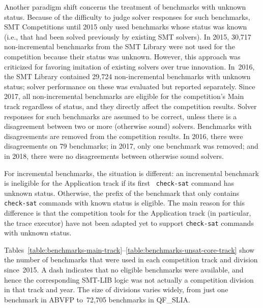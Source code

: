\documentclass[dvipsnames,table,twoside,11pt]{article}
\begin{document}
Another paradigm shift concerns the treatment of benchmarks with
unknown status.  Because of the difficulty to judge solver responses
for such benchmarks, SMT Competitions until 2015 only used benchmarks
whose status was known (i.e., that had been solved previously by
existing SMT solvers).  In 2015, 30,717 non-incremental benchmarks
from the SMT Library were not used for the competition because their
status was unknown.  However, this approach was criticized for
favoring imitation of existing solvers over true innovation.  In~2016,
the SMT Library contained 29,724 non-incremental benchmarks with
unknown status; solver performance on these was evaluated but reported
separately.  Since 2017, all non-incremental benchmarks are eligible
for the competition's Main track regardless of status, and they
directly affect the competition results.  Solver responses for such
benchmarks are assumed to be correct, unless there is a disagreement
between two or more (otherwise sound) solvers.  Benchmarks with
disagreements are removed from the competition results.  In 2016,
there were disagreements on 79 benchmarks; in 2017, only one benchmark
was removed; and in 2018, there were no disagreements between
otherwise sound solvers.

For incremental benchmarks, the situation is different: an incremental
benchmark is ineligible for the Application track if its first {\tt
  check-sat} command has unknown status.  Otherwise, the prefix of the
benchmark that only contains {\tt check-sat} commands with known
status is eligible.  The main reason for this difference is that the
competition tools for the Application track (in particular, the trace
executor) have not been adapted yet to support {\tt check-sat}
commands with unknown status.

Tables~\ref{table:benchmarks-main-track}--\ref{table:benchmarks-unsat-core-track}
show the number of benchmarks that were used in each competition track
and division since~2015.  A dash indicates that no eligible benchmarks
were available, and hence the corresponding SMT-LIB logic was not
actually a competition division in that track and year.  The size of
divisions varies widely, from just one benchmark in ABVFP to~72,705
benchmarks in QF\_SLIA.
\end{document}
